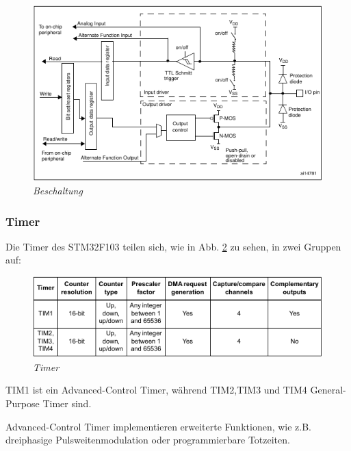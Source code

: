 \begin{figure}[h]
    \vspace{-\baselineskip}
        \centering
        \includegraphics[scale=0.6]{Pictures/gpio.png}
        \caption{\textit{Beschaltung \citep{STM32_Ref}}}
        \label{img:GPIO}
\end{figure}

\newpage


\subsubsection{Timer}
\label{subsub: Timer}

Die Timer des STM32F103 teilen sich, wie in Abb. \ref{img:Timer} zu sehen, in zwei Gruppen auf:

\vspace{0.5cm}
\begin{figure}[h]
    \vspace{-\baselineskip}
        \centering
        \includegraphics[scale=0.6]{Pictures/timer.png}
        \caption{\textit{Timer \citep{STM32_Datasheet}}}
        \label{img:Timer}
\end{figure}

TIM1 ist ein Advanced-Control Timer, während TIM2,TIM3 und TIM4 General-Purpose Timer sind. 

Advanced-Control Timer implementieren erweiterte Funktionen, wie z.B. dreiphasige Pulsweitenmodulation oder programmierbare 
Totzeiten\citep{STM32_Datasheet}. 


